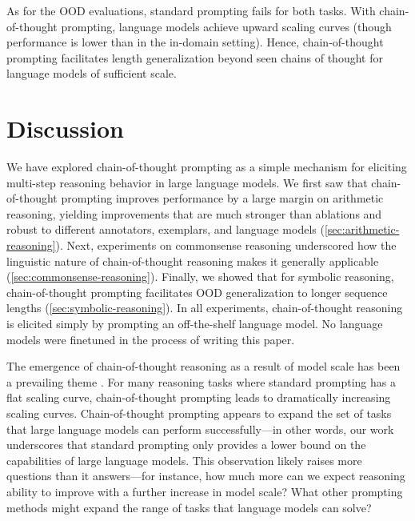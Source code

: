 \documentclass[]{article}
\theoremstyle{plain}
\theoremstyle{definition}
\theoremstyle{remark}
\begin{document}
As for the OOD evaluations, standard prompting fails for both tasks.
With chain-of-thought prompting, language models achieve upward scaling curves (though performance is lower than in the in-domain setting).
Hence, chain-of-thought prompting facilitates length generalization beyond seen chains of thought for language models of sufficient scale.


\section{Discussion}\label{sec:discussion}

We have explored chain-of-thought prompting as a simple mechanism for eliciting multi-step reasoning behavior in large language models.
We first saw that chain-of-thought prompting improves performance by a large margin on arithmetic reasoning, yielding improvements that are much stronger than ablations and robust to different annotators, exemplars, and language models (\cref{sec:arithmetic-reasoning}).
Next, experiments on commonsense reasoning underscored how the linguistic nature of chain-of-thought reasoning makes it generally applicable (\cref{sec:commonsense-reasoning}).
Finally, we showed that for symbolic reasoning, chain-of-thought prompting facilitates OOD generalization to longer sequence lengths (\cref{sec:symbolic-reasoning}).
In all experiments, chain-of-thought reasoning is elicited simply by prompting an off-the-shelf language model. 
No language models were finetuned in the process of writing this paper.

The emergence of chain-of-thought reasoning as a result of model scale has been a prevailing theme \citep{wei2022emergent}.
For many reasoning tasks where standard prompting has a flat scaling curve, chain-of-thought prompting leads to dramatically increasing scaling curves.
Chain-of-thought prompting appears to expand the set of tasks that large language models can perform successfully---in other words, our work underscores that standard prompting only provides a lower bound on the capabilities of large language models.
This observation likely raises more questions than it answers---for instance, how much more can we expect reasoning ability to improve with a further increase in model scale?
What other prompting methods might expand the range of tasks that language models can solve?
\end{document}
